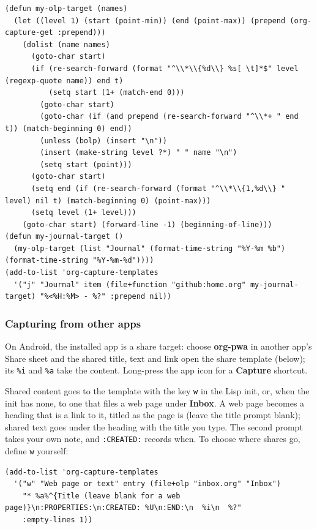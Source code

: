 \documentclass[11pt]{article}
\begin{document}
\begin{verbatim}
(defun my-olp-target (names)
  (let ((level 1) (start (point-min)) (end (point-max)) (prepend (org-capture-get :prepend)))
    (dolist (name names)
      (goto-char start)
      (if (re-search-forward (format "^\\*\\{%d\\} %s[ \t]*$" level (regexp-quote name)) end t)
          (setq start (1+ (match-end 0)))
        (goto-char start)
        (goto-char (if (and prepend (re-search-forward "^\\*+ " end t)) (match-beginning 0) end))
        (unless (bolp) (insert "\n"))
        (insert (make-string level ?*) " " name "\n")
        (setq start (point)))
      (goto-char start)
      (setq end (if (re-search-forward (format "^\\*\\{1,%d\\} " level) nil t) (match-beginning 0) (point-max)))
      (setq level (1+ level)))
    (goto-char start) (forward-line -1) (beginning-of-line)))
(defun my-journal-target ()
  (my-olp-target (list "Journal" (format-time-string "%Y-%m %b") (format-time-string "%Y-%m-%d"))))
(add-to-list 'org-capture-templates
  '("j" "Journal" item (file+function "github:home.org" my-journal-target) "%<%H:%M> - %?" :prepend nil))
\end{verbatim}

\subsubsection{Capturing from other apps}
\label{sec:org46417ca}
On Android, the installed app is a share target: choose \textbf{org-pwa} in another app's Share sheet and the shared title, text and link open the share template (below); its \texttt{\%i} and \texttt{\%a} take the content. Long-press the app icon for a \textbf{Capture} shortcut.

Shared content goes to the template with the key \texttt{w} in the Lisp init, or, when the init has none, to one that files a web page under \textbf{Inbox}. A web page becomes a heading that is a link to it, titled as the page is (leave the title prompt blank); shared text goes under the heading with the title you type. The second prompt takes your own note, and \texttt{:CREATED:} records when. To choose where shares go, define \texttt{w} yourself:

\begin{verbatim}
(add-to-list 'org-capture-templates
  '("w" "Web page or text" entry (file+olp "inbox.org" "Inbox")
    "* %a%^{Title (leave blank for a web page)}\n:PROPERTIES:\n:CREATED: %U\n:END:\n  %i\n  %?"
    :empty-lines 1))
\end{verbatim}
\end{document}
